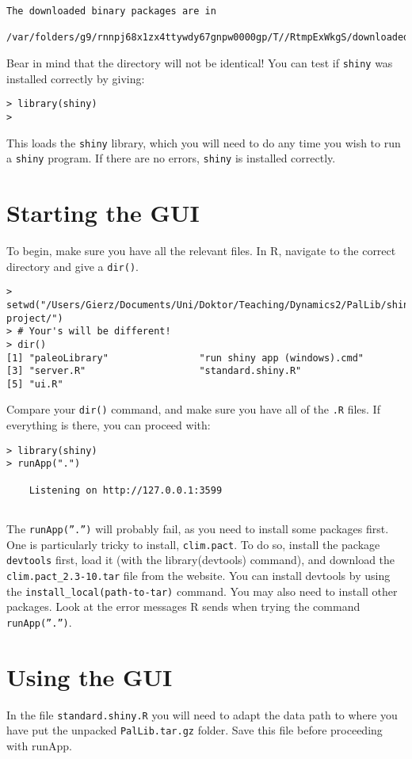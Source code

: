 \documentclass[a4paper,12pt]{article}
\begin{document}
\begin{verbatim}
The downloaded binary packages are in
	/var/folders/g9/rnnpj68x1zx4ttywdy67gnpw0000gp/T//RtmpExWkgS/downloaded_packages
\end{verbatim}

Bear in mind that the directory will not be identical! You can test if \texttt{shiny} was installed correctly by giving:
\begin{verbatim}
> library(shiny)
>
\end{verbatim}

This loads the \texttt{shiny} library, which you will need to do any time you wish to run a \texttt{shiny} program. If there are no errors, \texttt{shiny} is installed correctly.

\section*{Starting the GUI}

To begin, make sure you have all the relevant files. In R, navigate to the correct directory and give a \texttt{dir()}.
\begin{verbatim}
> setwd("/Users/Gierz/Documents/Uni/Doktor/Teaching/Dynamics2/PalLib/shiny-project/")
> # Your's will be different!
> dir()
[1] "paleoLibrary"                "run shiny app (windows).cmd"
[3] "server.R"                    "standard.shiny.R"           
[5] "ui.R"            
\end{verbatim}
Compare your \texttt{dir()} command, and make sure you have all of the \texttt{.R} files. If everything is there, you can proceed with:
\begin{verbatim}
> library(shiny)
> runApp(".")

    Listening on http://127.0.0.1:3599
    
\end{verbatim}

The \texttt{runApp(''.'')} will probably fail, as you need to
install some packages first. One is particularly tricky to install,
\texttt{clim.pact}. To do so, install the package \texttt{devtools}
first, load it (with the library(devtools) command), and download the
\texttt{clim.pact\_2.3-10.tar} file from the website. You can install
devtools by using the \texttt{install\_local(path-to-tar)} command. You
may also need to install other packages. Look at the error messages R
sends when trying the command \texttt{runApp(''.'')}. 

\vspace{1cm}
\section*{Using the GUI}
In the file \texttt{standard.shiny.R} you will need to adapt the data
path to where you have put the unpacked \texttt{PalLib.tar.gz}
folder. Save this file before proceeding with runApp.
\end{document}

